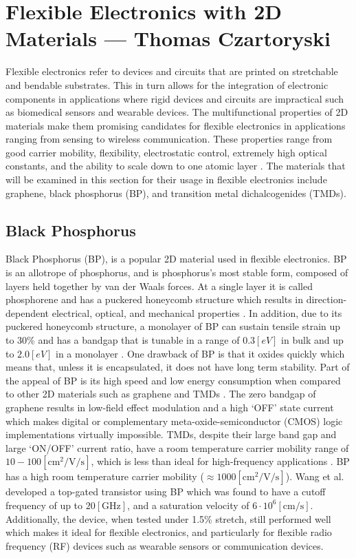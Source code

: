 \documentclass[conference]{IEEEtran}
\begin{document}
\section{Flexible Electronics with 2D Materials — Thomas Czartoryski}

Flexible electronics refer to devices and circuits that are printed on stretchable and bendable substrates. This in turn allows for the integration of electronic components in applications where rigid devices and circuits are impractical such as biomedical sensors and wearable devices. The multifunctional properties of 2D materials make them promising candidates for flexible electronics in applications ranging from sensing to wireless communication. These properties range from good carrier mobility, flexibility, electrostatic control, extremely high optical constants, and the ability to scale down to one atomic layer \cite{tc1}. The materials that will be examined in this section for their usage in flexible electronics include graphene, black phosphorus (BP), and transition metal dichalcogenides (TMDs).

\subsection{Black Phosphorus}

Black Phosphorus (BP), is a popular 2D material used in flexible electronics. BP is an allotrope of phosphorus, and is phosphorus's most stable form, composed of layers held together by van der Waals forces. At a single layer it is called phosphorene and has a puckered honeycomb structure which results in direction-dependent electrical, optical, and mechanical properties \cite{tc2,tc3}. In addition, due to its puckered honeycomb structure, a monolayer of BP can sustain tensile strain up to 30\% and has a bandgap that is tunable in a range of $0.3[\si{eV}]$ in bulk and up to $2.0[\si{eV}]$ in a monolayer \cite{tc3}. One drawback of BP is that it oxides quickly which means that, unless it is encapsulated, it does not have long term stability. Part of the appeal of BP is its high speed and low energy consumption when compared to other 2D materials such as graphene and TMDs \cite{tc2}. The zero bandgap of graphene results in low-field effect modulation and a high `\textsc{OFF}' state current which makes digital or complementary meta-oxide-semiconductor (CMOS) logic implementations virtually impossible. TMDs, despite their large band gap and large `\textsc{ON/OFF}' current ratio, have a room temperature carrier mobility range of $10-100[\si{\centi\meter\squared\per\volt\per\second}]$, which is less than ideal for high-frequency applications \cite{tc4}. BP has a high room temperature carrier mobility ($\approx1000[\si{\centi\meter\squared\per\volt\per\second}]$). Wang et al. \cite{tc4} developed a top-gated transistor using BP which was found to have a cutoff frequency of up to $20[\si{\giga\hertz}]$, and a saturation velocity of $6\cdot10^6[\si{\centi\meter\per\second}]$. Additionally, the device, when tested under 1.5\% stretch, still performed well which makes it ideal for flexible electronics, and particularly for flexible radio frequency (RF) devices such as wearable sensors or communication devices.
\end{document}
